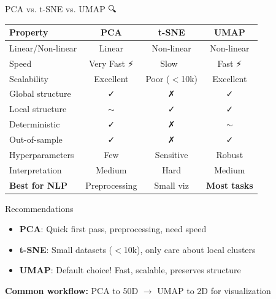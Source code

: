 \documentclass[aspectratio=169]{beamer}
\begin{document}
\begin{frame}{PCA vs. t-SNE vs. UMAP 🔍}
\begin{center}
\begin{tabular}{lccc}
\toprule
\textbf{Property} & \textbf{PCA} & \textbf{t-SNE} & \textbf{UMAP} \\
\midrule
Linear/Non-linear & Linear & Non-linear & Non-linear \\
Speed & Very Fast ⚡ & Slow 🐌 & Fast ⚡ \\
Scalability & Excellent & Poor ($<$10k) & Excellent \\
Global structure & ✓ & ✗ & ✓ \\
Local structure & $\sim$ & ✓ & ✓ \\
Deterministic & ✓ & ✗ & $\sim$ \\
Out-of-sample & ✓ & ✗ & ✓ \\
Hyperparameters & Few & Sensitive & Robust \\
Interpretation & Medium & Hard & Medium \\
\textbf{Best for NLP} & Preprocessing & Small viz & \textbf{Most tasks} \\
\bottomrule
\end{tabular}
\end{center}

\vspace{1em}

\begin{block}{Recommendations}
\begin{itemize}\setlength{\itemsep}{0pt}
    \item \textbf{PCA}: Quick first pass, preprocessing, need speed
    \item \textbf{t-SNE}: Small datasets ($<$10k), only care about local clusters
    \item \textbf{UMAP}: \alert{Default choice!} Fast, scalable, preserves structure
\end{itemize}
\end{block}

\vspace{0.5em}
\textbf{Common workflow:} PCA to 50D $\rightarrow$ UMAP to 2D for visualization
\end{frame}
\end{document}

